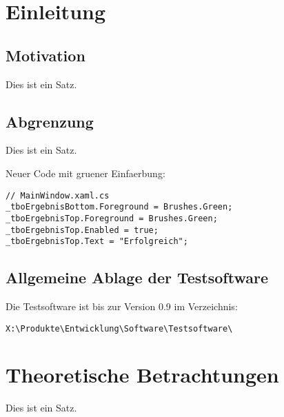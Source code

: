 \documentclass[a4paper, 11pt]{article}
\begin{document}
\section{Einleitung}

\subsection{Motivation}

Dies ist ein Satz.

\subsection{Abgrenzung}

Dies ist ein Satz.

Neuer Code mit gruener Einfaerbung:

\begin{lstlisting}[style=sharpc]
// MainWindow.xaml.cs
_tboErgebnisBottom.Foreground = Brushes.Green;
_tboErgebnisTop.Foreground = Brushes.Green;
_tboErgebnisTop.Enabled = true;
_tboErgebnisTop.Text = "Erfolgreich";
\end{lstlisting}

\subsection{Allgemeine Ablage der Testsoftware} \label{sssec:num1}
Die Testsoftware ist bis zur Version 0.9 im Verzeichnis:

\begin{lstlisting}[style=synless]
X:\Produkte\Entwicklung\Software\Testsoftware\
\end{lstlisting}


\newpage
\section{Theoretische Betrachtungen}

Dies ist ein Satz.

\end{document}
